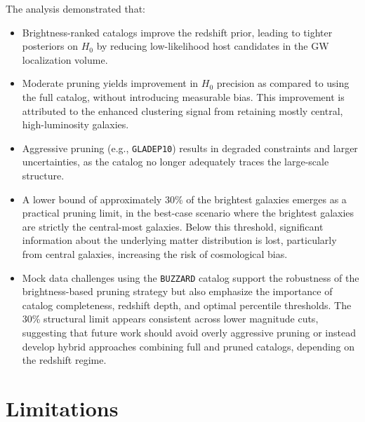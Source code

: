 The analysis demonstrated that:
\vspace{-1em}
\begin{itemize}
    \item Brightness-ranked catalogs improve the redshift prior, leading to tighter posteriors on $H_0$ by reducing low-likelihood host candidates in the \ac{GW} localization volume.
    \vspace{-1em}
    \item Moderate pruning yields improvement in $H_0$ precision as compared to using the full catalog, without introducing measurable bias. This improvement is attributed to the enhanced clustering signal from retaining mostly central, high-luminosity galaxies.
    \vspace{-1em}
    \item Aggressive pruning (e.g., \texttt{GLADEP10}) results in degraded constraints and larger uncertainties, as the catalog no longer adequately traces the large-scale structure.
    \vspace{-1em}
    \item A lower bound of approximately 30\% of the brightest galaxies emerges as a practical pruning limit, in the best-case scenario where the brightest galaxies are strictly the central-most galaxies. Below this threshold, significant information about the underlying matter distribution is lost, particularly from central galaxies, increasing the risk of cosmological bias.
    \vspace{-1em}
    \item Mock data challenges using the \texttt{BUZZARD} catalog support the robustness of the brightness-based pruning strategy but also emphasize the importance of catalog completeness, redshift depth, and optimal percentile thresholds. The 30\% structural limit appears consistent across lower magnitude cuts, suggesting that future work should avoid overly aggressive pruning or instead develop hybrid approaches combining full and pruned catalogs, depending on the redshift regime.
\end{itemize}

\section{Limitations}

